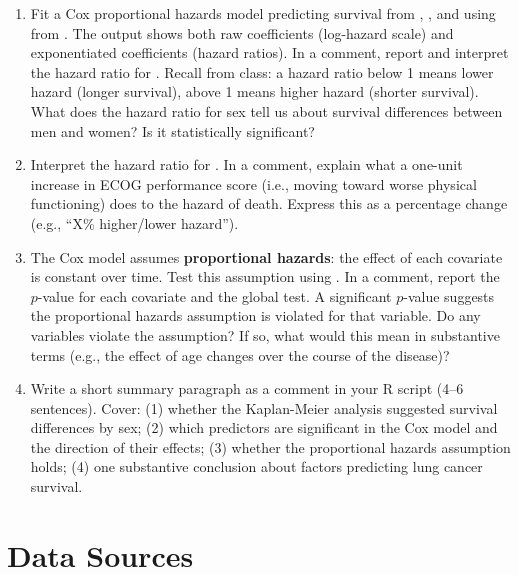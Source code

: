 \begin{enumerate}[label=\alph*)]

  \item Fit a Cox proportional hazards model predicting survival from , , and  using  from . The output shows both raw coefficients (log-hazard scale) and exponentiated coefficients (hazard ratios). In a comment, report and interpret the hazard ratio for . Recall from class: a hazard ratio below 1 means lower hazard (longer survival), above 1 means higher hazard (shorter survival). What does the hazard ratio for sex tell us about survival differences between men and women? Is it statistically significant?

  \item Interpret the hazard ratio for . In a comment, explain what a one-unit increase in ECOG performance score (i.e., moving toward worse physical functioning) does to the hazard of death. Express this as a percentage change (e.g., ``X\% higher/lower hazard'').

  \item The Cox model assumes \textbf{proportional hazards}: the effect of each covariate is constant over time. Test this assumption using . In a comment, report the $p$-value for each covariate and the global test. A significant $p$-value suggests the proportional hazards assumption is violated for that variable. Do any variables violate the assumption? If so, what would this mean in substantive terms (e.g., the effect of age changes over the course of the disease)?

  \item Write a short summary paragraph as a comment in your R script (4--6 sentences). Cover: (1) whether the Kaplan-Meier analysis suggested survival differences by sex; (2) which predictors are significant in the Cox model and the direction of their effects; (3) whether the proportional hazards assumption holds; (4) one substantive conclusion about factors predicting lung cancer survival.

\end{enumerate}

\vspace{15pt}

\section{Data Sources}

